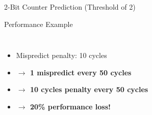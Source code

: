 \documentclass[aspectratio=169,12pt]{beamer}
\begin{document}
\begin{frame}{2-Bit Counter Prediction (Threshold of 2)}
\begin{block}{Performance Example}
\begin{columns}[T]
\begin{itemize}
\item Mispredict penalty: 10 cycles
\item[] \textcolor{incorrectred}{\textbf{$\rightarrow$ 1 mispredict every 50 cycles}}
\item[] \textcolor{incorrectred}{\textbf{$\rightarrow$ 10 cycles penalty every 50 cycles}}
\item[] \textcolor{incorrectred}{\textbf{$\rightarrow$ 20\% performance loss!}}
\end{itemize}
\end{columns}
\end{block}

\end{frame}
\end{document}

